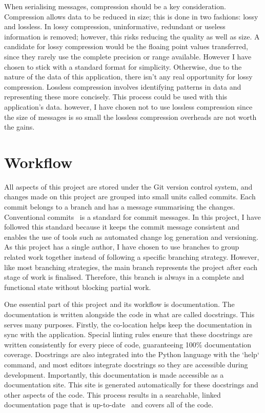 \documentclass[]{final_report}
\begin{document}
When serialising messages, compression should be a key consideration. Compression allows data to be reduced in size; this is done in two fashions: lossy and lossless. In lossy compression, uninformative, redundant or useless information is removed; however, this risks reducing the quality as well as size. A candidate for lossy compression would be the floaing point values transferred, since they rarely use the complete precision or range available. However I have chosen to stick with a standard format for simplicity. Otherwise, due to the nature of the data of this application, there isn't any real opportunity for lossy compression. Lossless compression involves identifying patterns in data and representing these more concisely. This process could be used with this application's data. however, I have chosen not to use lossless compression since the size of messages is so small the lossless compression overheads are not worth the gains. 

\section{Workflow}


All aspects of this project are stored under the Git version control system, and changes made on this project are grouped into small units called commits. Each commit belongs to a branch and has a message summarising the changes. Conventional commits~\cite{conventionalCommitsOnline} is a standard for commit messages. In this project, I have followed this standard because it keeps the commit message consistent and enables the use of tools such as automated change log generation and versioning. As this project has a single author, I have chosen to use branches to group related work together instead of following a specific branching strategy. However, like most branching strategies, the main branch represents the project after each stage of work is finalised. Therefore, this branch is always in a complete and functional state without blocking partial work. 

One essential part of this project and its workflow is documentation. The documentation is written alongside the code in what are called docstrings. This serves many purposes. Firstly, the co-location helps keep the documentation in sync with the application. Special linting rules ensure that these docstrings are written consistently for every piece of code, guaranteeing 100\% documentation coverage. Docstrings are also integrated into the Python language with the `help` command, and most editors integrate docstrings so they are accessible during development. Importantly, this documentation is made accessible as a documentation site. This site is generated automatically for these docstrings and other aspects of the code. This process results in a searchable, linked documentation page that is up-to-date~\cite{pythonAutoDoc} and covers all of the code. 
\end{document}

